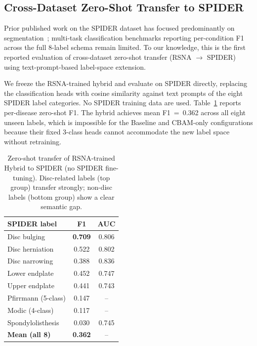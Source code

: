 \documentclass[conference]{IEEEtran}
\newcommand{\best}[1]{\textcolor{best}{\textbf{#1}}}
\begin{document}
\subsection{Cross-Dataset Zero-Shot Transfer to SPIDER}

Prior published work on the SPIDER dataset has focused predominantly
on segmentation~\cite{vandergraaf2024spider}; multi-task classification
benchmarks reporting per-condition F1 across the full 8-label schema
remain limited. To our knowledge, this is the first reported
evaluation of cross-dataset zero-shot transfer (RSNA $\to$ SPIDER)
using text-prompt-based label-space extension.

We freeze the RSNA-trained hybrid and evaluate on SPIDER directly,
replacing the classification heads with cosine similarity against
text prompts of the eight SPIDER label categories. No SPIDER training
data are used. Table~\ref{tab:spider} reports per-disease zero-shot
F1. The hybrid achieves mean F1~=~0.362 across all eight unseen
labels, which is impossible for the Baseline and CBAM-only configurations
because their fixed 3-class heads cannot accommodate the new label
space without retraining.

\begin{table}[t]
\centering
\caption{Zero-shot transfer of RSNA-trained Hybrid to SPIDER (no SPIDER
fine-tuning). Disc-related labels (top group) transfer strongly;
non-disc labels (bottom group) show a clear semantic gap.}
\label{tab:spider}
\renewcommand{\arraystretch}{1.05}
\begin{tabular}{@{}lcc@{}}
\toprule
SPIDER label              & F1     & AUC \\
\midrule
Disc bulging              & \best{0.709} & 0.806 \\
Disc herniation           & 0.522 & 0.802 \\
Disc narrowing            & 0.388 & 0.836 \\
\midrule
Lower endplate            & 0.452 & 0.747 \\
Upper endplate            & 0.441 & 0.743 \\
Pfirrmann (5-class)       & 0.147 & --     \\
Modic (4-class)           & 0.117 & --     \\
Spondylolisthesis         & 0.030 & 0.745 \\
\midrule
\textbf{Mean (all 8)}     & \best{0.362} & --     \\
\bottomrule
\end{tabular}
\end{table}
\end{document}
